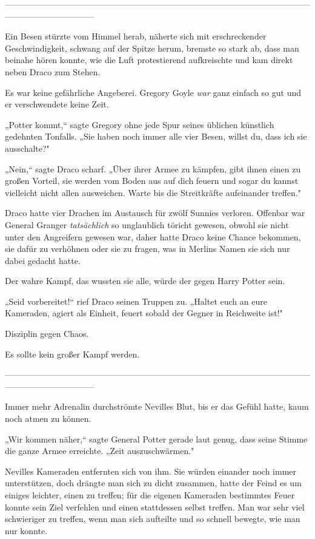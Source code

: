 {--------------------------------------------------------------------------------------------------------------------------------------------

\hfill\break Ein Besen stürzte vom Himmel herab, näherte sich mit erschreckender Geschwindigkeit, schwang auf der Spitze herum, bremste so stark ab, dass man beinahe hören konnte, wie die Luft protestierend aufkreischte und kam direkt neben Draco zum Stehen.

Es war keine gefährliche Angeberei. Gregory Goyle \emph{war} ganz einfach so gut und er verschwendete keine Zeit.

„Potter kommt,“ sagte Gregory ohne jede Spur seines üblichen künstlich gedehnten Tonfalls. „Sie haben noch immer alle vier Besen, willst du, dass ich sie ausschalte?"

„Nein,“ sagte Draco scharf. „Über ihrer Armee zu kämpfen, gibt ihnen einen zu großen Vorteil, sie werden vom Boden aus auf dich feuern und sogar du kannst vielleicht nicht allen ausweichen. Warte bis die Streitkräfte aufeinander treffen."

Draco hatte vier Drachen im Austausch für zwölf Sunnies verloren. Offenbar war General Granger \emph{tatsächlich} so unglaublich töricht gewesen, obwohl sie nicht unter den Angreifern gewesen war, daher hatte Draco keine Chance bekommen, sie dafür zu verhöhnen oder sie zu fragen, was in Merlins Namen sie sich nur dabei gedacht hatte.

Der wahre Kampf, das wussten sie alle, würde der gegen Harry Potter sein.

„Seid vorbereitet!“ rief Draco seinen Truppen zu. „Haltet euch an eure Kameraden, agiert als Einheit, feuert sobald der Gegner in Reichweite ist!"

Disziplin gegen Chaos.

Es sollte kein großer Kampf werden.

--------------------------------------------------------------------------------------------------------------------------------------------

\hfill\break Immer mehr Adrenalin durchströmte Nevilles Blut, bis er das Gefühl hatte, kaum noch atmen zu können.

„Wir kommen näher,“ sagte General Potter gerade laut genug, dass seine Stimme die ganze Armee erreichte. „Zeit auszuschwärmen."

Nevilles Kameraden entfernten sich von ihm. Sie würden einander noch immer unterstützen, doch drängte man sich zu dicht zusammen, hatte der Feind es um einiges leichter, einen zu treffen; für die eigenen Kameraden bestimmtes Feuer konnte sein Ziel verfehlen und einen stattdessen selbst treffen. Man war sehr viel schwieriger zu treffen, wenn man sich aufteilte und so schnell bewegte, wie man nur konnte.

}
